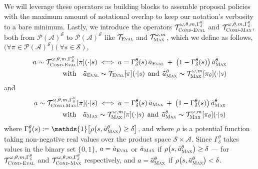 We will leverage these operators as building blocks to assemble
proposal policies with the maximum amount of notational overlap to keep our notation's verbosity to a bare minimum.
Lastly, we introduce the operators $\mathcal{T}_\textsc{Cond-Eval}^{\omega, \theta, m, \Gamma^\theta_\delta}$
and $\mathcal{T}_\textsc{Cond-Max}^{\omega, \theta, m, \Gamma^\theta_\delta}$,
both from $\mathcal{P}(\mathcal{A})^\mathcal{S}$ to $\mathcal{P}(\mathcal{A})^\mathcal{S}$
like $\mathcal{T}_\textsc{Eval}$ and $\mathcal{T}_\textsc{Max}^{\omega, m}$, which we define
as follows, $\big(\forall \pi \in \mathcal{P}(\mathcal{A})^\mathcal{S}\big)
(\forall s \in \mathcal{S})$,
\begin{align}
  a \sim \mathcal{T}_\textsc{Cond-Eval}^{\omega, \theta, m, \Gamma^\theta_\delta}[\pi](\cdot | s)
  \iff
  a = \Gamma^\theta_\delta(s) \, \tilde{a}_\textsc{Eval} \: + \: \big(1 - \Gamma^\theta_\delta(s)\big) \,
  \tilde{a}^\theta_\textsc{Max} \label{spievaleq} \\
  \text{with} \quad
  \tilde{a}_\textsc{Eval} \sim \mathcal{T}_\textsc{Eval}[\pi](\cdot | s)
  \;\, \text{and} \;\,
  \tilde{a}^\theta_\textsc{Max} \sim \mathcal{T}_\textsc{Max}^{\omega, m}[\pi_\theta](\cdot | s)
\end{align}
and
\begin{align}
  a \sim \mathcal{T}_\textsc{Cond-Max}^{\omega, \theta, m, \Gamma^\theta_\delta}[\pi](\cdot | s)
  \iff
  a = \Gamma^\theta_\delta(s) \, \tilde{a}_\textsc{Max} \: + \: \big(1 - \Gamma^\theta_\delta(s)\big) \,
  \tilde{a}^\theta_\textsc{Max} \label{spimaxeq} \\
  \text{with} \quad
  \tilde{a}_\textsc{Max} \sim \mathcal{T}_\textsc{Max}^{\omega, m}[\pi](\cdot | s)
  \;\, \text{and} \;\,
  \tilde{a}^\theta_\textsc{Max} \sim \mathcal{T}_\textsc{Max}^{\omega, m}[\pi_\theta](\cdot | s)
\end{align}
where $\Gamma^\theta_\delta(s) \coloneqq
\mathds{1}\big[\rho \big(s, \tilde{a}^\theta_\textsc{Max}\big) \geq \delta \big]$,
and where $\rho$ is a potential function taking non-negative real values over the product space
$\mathcal{S} \times \mathcal{A}$.
Since $\Gamma^\theta_\delta$ takes values in the binary set $\{0,1\}$,
$a = \tilde{a}_\textsc{Eval}$ or $\tilde{a}_\textsc{Max}$
if $\rho \big(s, \tilde{a}^\theta_\textsc{Max}\big) \geq \delta$
--- for $\mathcal{T}_\textsc{Cond-Eval}^{\omega, \theta, m, \Gamma^\theta_\delta}$
and $\mathcal{T}_\textsc{Cond-Max}^{\omega, \theta, m, \Gamma^\theta_\delta}$ respectively,
and $a = \tilde{a}^\theta_\textsc{Max}$ if $\rho \big(s, \tilde{a}^\theta_\textsc{Max}\big) < \delta$.
